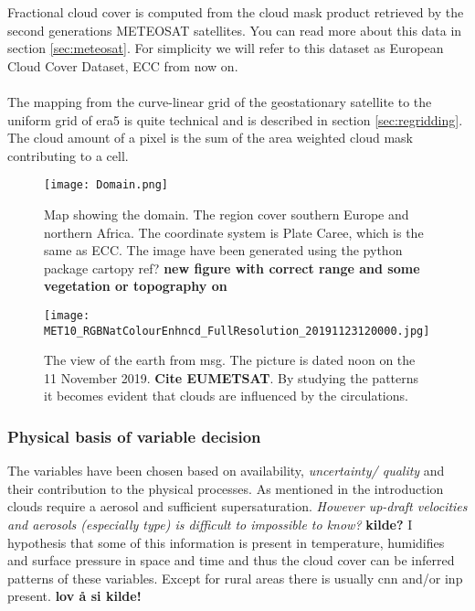 Fractional cloud cover is computed from the cloud mask product retrieved by the second generations METEOSAT satellites. You can read more about this data in section \ref{sec:meteosat}. For simplicity we will refer to this dataset as European Cloud Cover Dataset, ECC from now on. 
\\ \\ 
The mapping from the curve-linear grid of the geostationary satellite to the uniform grid of era5 is quite technical and is described in section \ref{sec:regridding}. The cloud amount of a pixel is the sum of the area weighted cloud mask contributing to a cell.


\begin{figure}[h]
    \centering
    \texttt{[image: Domain.png]}
    \caption{Map showing the domain. The region cover southern Europe and northern Africa. The coordinate system is Plate Caree, which is the same as ECC. The image have been generated using the python package cartopy ref? \textbf{new figure with correct range and some vegetation or topography on  }}
    \label{fig:map}
\end{figure}

\begin{figure}[h]
    \centering
    \texttt{[image: MET10\_RGBNatColourEnhncd\_FullResolution\_20191123120000.jpg]}
    \caption{The view of the earth from \acrshort{msg}. The picture is dated noon on the 11 November 2019. \textbf{Cite EUMETSAT}. By studying the patterns it becomes evident that clouds are influenced by the circulations. }
    \label{fig:sat_view}
\end{figure}

\subsubsection{Physical basis of variable decision}
The variables have been chosen based on availability, \textit{uncertainty/ quality} and their contribution to the physical processes. As mentioned in the introduction clouds require a aerosol and sufficient supersaturation.\textit{ However up-draft velocities and aerosols (especially type) is difficult to impossible to know?} \textbf{kilde?} I hypothesis that some of this information is present in temperature, humidifies and surface pressure in space and time and thus the cloud cover can be inferred patterns of these variables. Except for rural areas there is usually \acrshort{cnn} and/or \acrshort{inp} present. \textbf{lov å si kilde!}


